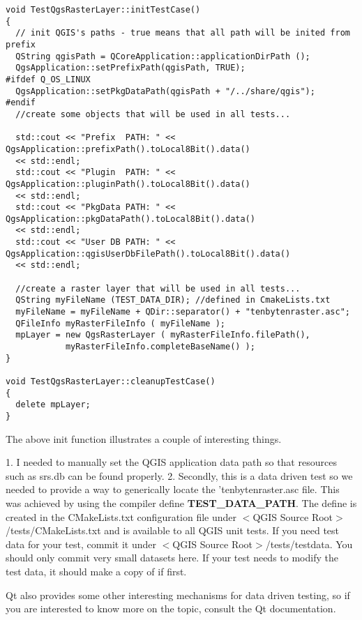 \begin{verbatim}
void TestQgsRasterLayer::initTestCase()
{
  // init QGIS's paths - true means that all path will be inited from prefix
  QString qgisPath = QCoreApplication::applicationDirPath ();
  QgsApplication::setPrefixPath(qgisPath, TRUE);
#ifdef Q_OS_LINUX
  QgsApplication::setPkgDataPath(qgisPath + "/../share/qgis");
#endif
  //create some objects that will be used in all tests...

  std::cout << "Prefix  PATH: " << QgsApplication::prefixPath().toLocal8Bit().data() 
  << std::endl;
  std::cout << "Plugin  PATH: " << QgsApplication::pluginPath().toLocal8Bit().data() 
  << std::endl;
  std::cout << "PkgData PATH: " << QgsApplication::pkgDataPath().toLocal8Bit().data() 
  << std::endl;
  std::cout << "User DB PATH: " << QgsApplication::qgisUserDbFilePath().toLocal8Bit().data() 
  << std::endl;

  //create a raster layer that will be used in all tests...
  QString myFileName (TEST_DATA_DIR); //defined in CmakeLists.txt
  myFileName = myFileName + QDir::separator() + "tenbytenraster.asc";
  QFileInfo myRasterFileInfo ( myFileName );
  mpLayer = new QgsRasterLayer ( myRasterFileInfo.filePath(),
            myRasterFileInfo.completeBaseName() );
}

void TestQgsRasterLayer::cleanupTestCase()
{
  delete mpLayer;
}

\end{verbatim}

The above init function illustrates a couple of interesting things.

 1. I needed to manually set the QGIS application data path so that
   resources such as srs.db can be found properly.
 2. Secondly, this is a data driven test so we needed to provide a 
   way to generically locate the 'tenbytenraster.asc file. This was 
   achieved by using the compiler define \textbf{TEST\_DATA\_PATH}. The 
   define is created in the CMakeLists.txt configuration file under 
   $<$QGIS Source Root$>$/tests/CMakeLists.txt and is available to all 
   QGIS unit tests. If you need test data for your test, commit it 
   under $<$QGIS Source Root$>$/tests/testdata. You should only commit 
   very small datasets here. If your test needs to modify the test 
   data, it should make a copy of if first.

Qt also provides some other interesting mechanisms for data driven 
testing, so if you are interested to know more on the topic, consult 
the Qt documentation.


